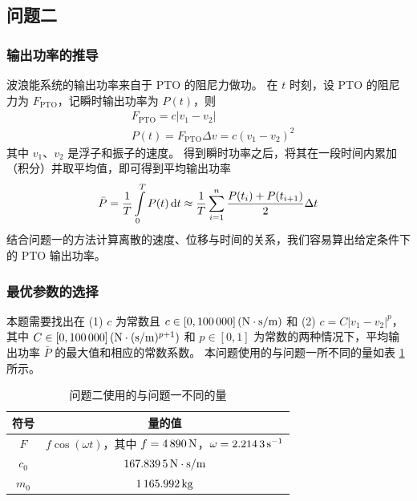 \subsection{问题二}

\subsubsection{输出功率的推导}

波浪能系统的输出功率来自于 PTO 的阻尼力做功。
在 $t$ 时刻，设 PTO 的阻尼力为 $F_\text{PTO}$，记瞬时输出功率为 $P(t)$，则
    \begin{align}
        & F_\text{PTO}=c|v_1-v_2| \\
        & P(t)=F_\text{PTO}\Delta v=c(v_1-v_2)^2
    \end{align}
其中 $v_1$、$v_2$ 是浮子和振子的速度。
得到瞬时功率之后，将其在一段时间内累加（积分）并取平均值，即可得到平均输出功率
\begin{equation}
    \bar{P}=\dfrac{1}{T}\int\limits_0^TP(t)\mathop{}\!\mathrm{d} t\approx\dfrac{1}{T}\sum_{i=1}^n\dfrac{P(t_i)+P(t_{i+1})}{2}\Delta t
\end{equation}
结合问题一的方法计算离散的速度、位移与时间的关系，我们容易算出给定条件下的 PTO 输出功率。

\subsubsection{最优参数的选择}

本题需要找出在 (1) $c$ 为常数且 $c\in[0, \N{100000}]\,(\mathrm{N}\cdot\mathrm{s}/\mathrm{m})$ 和 (2) $c=C|v_1-v_2|^p$，其中 $C\in[0, \N{100000}]\,(\mathrm{N}\cdot(\mathrm{s}/\mathrm{m})^{p+1})$ 和 $p\in[0, 1]$ 为常数的两种情况下，平均输出功率 $\bar{P}$ 的最大值和相应的常数系数。
本问题使用的与问题一所不同的量如表 \ref{consts-2} 所示。
\begin{table}[htbp]
    \centering
    \begin{tabular}{cc}
        \toprule
        符号 & 量的值 \\
        \midrule
        $F$ & $f\cos(\omega t)$，其中 $f=\N{4890}\,\mathrm{N}$，$\omega=\N{2.2143}\,\mathrm{s}^{-1}$ \\
        $c_0$ & $\N{167.8395}\,\mathrm{N}\cdot\mathrm{s}/\mathrm{m}$ \\
        $m_0$ & $\N{1165.992}\,\mathrm{kg}$ \\
        \bottomrule
    \end{tabular}
    \caption{问题二使用的与问题一不同的量}
    \label{consts-2}
\end{table}

